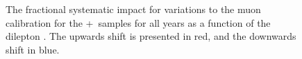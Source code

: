 {\begin{figure}[h!]
  \caption{The fractional systematic impact for variations to the muon calibration for the \powheg+\pythia~samples for all years as a function of the dilepton \pt. The upwards shift is presented in red, and the downwards shift in blue.}
  \label{fig:PP8MuCalSystpTll}
\end{figure}

}
